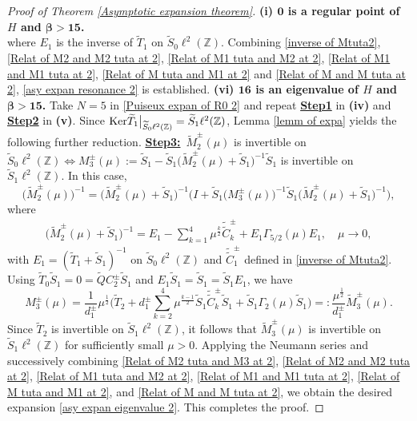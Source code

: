 \documentclass[reqno, 11pt]{amsart}
\newcommand\Z{\mathbb{Z}}
\numberwithin{equation}{section}
\begin{document}
\begin{proof}[Proof of Theorem {\rm\ref{Asymptotic expansion theorem}}]{\bf{(i) ${\bm{0}}$ is a regular point of $H$ and {$\bm{\beta>15}$}.}}
\begin{equation}
\end{equation}
where $E_1$ is the inverse of $\widetilde{T}_1$ on $\widetilde{S}_0\ell^2(\Z)$.
Combining \eqref{inverse of Mtuta2}, \eqref{Relat of M2 and M2 tuta at 2}, \eqref{Relat of M1 tuta and M2 at 2}, \eqref{Relat of M1 and M1 tuta at 2}, \eqref{Relat of M tuta and M1 at 2} and \eqref{Relat of M and M tuta at 2}, \eqref{asy expan resonance 2} is established. 
\vskip0.2cm
{\bf{(vi) ${\bm{16}}$ is an eigenvalue of $H$ and {$\bm{\beta>15}$}.}} Take $N=5$ in \eqref{Puiseux expan of R0 2} and repeat {\bf{\underline{Step1}}} in {\bf{(iv)}} and {\bf{\underline{Step2}}} in {\bf{(v)}}. Since ${\rm Ker}\widetilde{T}_1\big|_{\widetilde{S}_0\ell^2(\Z)}=\widetilde{S}_1\ell^2(\Z)$, Lemma \ref{lemm of expa} yields the following further reduction.
\vskip0.15cm
{\bf{\underline{Step3:}}}\ $\widetilde{M}_{2}^{\pm}(\mu)$ is invertible on $\widetilde{S}_0\ell^{2}(\Z)\Leftrightarrow M^{\pm}_{3}(\mu):=\widetilde{S}_1-\widetilde{S}_1\big(\widetilde{M}_{2}^{\pm}(\mu)+\widetilde{S}_1\big)^{-1}\widetilde{S}_1$ is invertible on $\widetilde{S}_1\ell^{2}(\Z)$. In this case,
\begin{equation}\label{Relat of M2 tuta and M3 at 2}
\big(\widetilde{M}_{2}^{\pm}(\mu)\big)^{-1}=\big(\widetilde{M}_{2}^{\pm}(\mu)+\widetilde{S}_1\big)^{-1}\Big(I+\widetilde{S}_1\big(M^{\pm}_{3}(\mu)\big)^{-1}\widetilde{S}_1\big(\widetilde{M}_{2}^{\pm}(\mu)+\widetilde{S}_1\big)^{-1}\Big),
\end{equation}
where
\begin{align*}
\big(\widetilde{M}_{2}^{\pm}(\mu)+\widetilde{S}_1\big)^{-1}=E_1-\sum\limits_{k=1}^{4}\mu^{\frac{k}{2}}\tilde{\tilde{C}}^{\pm}_{k}+E_1\Gamma_{5/2}(\mu)E_1,\quad \mu\rightarrow0,
\end{align*}
with $E_1=(\widetilde{T}_1+\widetilde{S}_1)^{-1}$ on $\widetilde{S}_0\ell^2(\Z)$ and $\tilde{\tilde{C}}^{\pm}_{1}$ defined in \eqref{inverse of Mtuta2}. Using $\widetilde{T}_0\widetilde{S}_1=0=\widetilde{Q}C^{\pm}_2\widetilde{S}_1$ and $E_1\widetilde{S}_1=\widetilde{S}_1=\widetilde{S}_1E_1$, we have
\begin{equation*}
M^{\pm}_3(\mu)=\frac{1}{d^{\pm}_1}\mu^{\frac{1}{2}}\Big(\widetilde{T}_2+{d^{\pm}_1}\sum\limits_{k=2}^{4}\mu^{\frac{k-1}{2}}\widetilde{S}_1\tilde{\tilde{C}}^{\pm}_{k}\widetilde{S}_1+\widetilde{S}_1\Gamma_{2}(\mu)\widetilde{S}_1\Big)=:\frac{\mu^{\frac{1}{2}}}{d^{\pm}_1}\widetilde{M}^{\pm}_3(\mu).
\end{equation*}
Since $\widetilde{T}_2$ is invertible on $\widetilde{S}_1\ell^2(\Z)$, it follows that $\widetilde{M}^{\pm}_3(\mu)$ is invertible on $\widetilde{S}_1\ell^2(\Z)$ for sufficiently small $\mu>0$. Applying the Neumann series and successively combining \eqref{Relat of M2 tuta and M3 at 2}, \eqref{Relat of M2 and M2 tuta at 2}, \eqref{Relat of M1 tuta and M2 at 2}, \eqref{Relat of M1 and M1 tuta at 2}, \eqref{Relat of M tuta and M1 at 2}, and \eqref{Relat of M and M tuta at 2}, we obtain the desired expansion \eqref{asy expan eigenvalue 2}. This completes the proof.
\end{proof}
\end{document}
